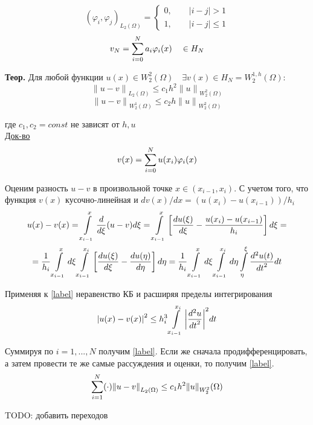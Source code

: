 \[ {(\varphi_i, \varphi_j)}_{L_2(\Omega)} = \left\{ \begin{array}{l}
	0, \qquad |i-j| > 1 \\
	1, \qquad |i-j| \leq 1
\end{array} \right. \]
\[ v_N = \sum\limits_{i = 0}^{N} a_i \varphi_i(x) \quad \in H_N \]

\textbf{Теор.} Для любой функции $u(x) \in W_2^2 (\Omega) \quad \exists v(x) \in H_N = W_2^{1, h} (\Omega)$:
\[ {\| u - v \|}_{L_2(\Omega)} \leq c_1 h^2 {\|u\|}_{W_2^2 (\Omega)}  \]
\[ {\| u - v \|}_{W_2^1 (\Omega)}  \leq c_2 h {\|u\|}_{W_2^2 (\Omega)}  \]

где $c_1, c_2 = const$ не зависят от $h, u$ \\

\underline{Док-во}
\[ v(x) = \sum\limits_{i=0}^{N} u(x_i) \varphi_i (x) \]

Оценим разность $u - v$ в произвольной точке $x \in (x_{i-1}, x_i)$. С учетом того, что функция $v(x)$ кусочно-линейная и $dv(x)/dx = (u(x_i) - u(x_{i-1}))/h_i$
\begin{multline*}
	u(x) - v(x) = \int\limits_{x_{i-1}}^{x} \frac{d}{d\xi}(u-v) d\xi = \int\limits_{x_{i-1}}^{x} \left[ \frac{du(\xi)}{d\xi} - \frac{u(x_i) - u(x_{i-1})}{h_i} \right] d\xi = \\
	= \frac{1}{h_i} \int\limits_{x_{i-1}}^{x} d\xi \int\limits_{x_{i-1}}^{x_i} \left[ \frac{du (\xi)}{d\xi} - \frac{du(\eta)}{d \eta} \right] d\eta = \frac{1}{h_i} \int\limits_{x_{i-1}}^{x} d\xi \int\limits_{x_{i-1}}^{x_i} d \eta \int\limits_{\eta}^{\xi} \frac{d^2u(t)}{{dt}^2} dt
\end{multline*}

Применяя к \eqref{label} неравенство КБ и расширяя пределы интегрирования
\[ {|u(x) - v(x)|}^2 \leq h_i^3 \int\limits_{x_{i-1}}^{x_i} {\left|\frac{d^2u}{{dt}^2} \right|}^2 dt \]

Суммируя по $i = 1,...,N$ получим \eqref{label}. Если же сначала продифференцировать, а затем провести те же самые рассуждения и оценки, то получим \eqref{label}.
\[ \sum\limits_{i=1}^{N} (\cdot) {\|u-v\|}_{L_2 (\Omega)} \leq c_1 h^2 {\|u\|}_{W^2_2} (\Omega)\]

TODO: добавить переходов

\newpage
